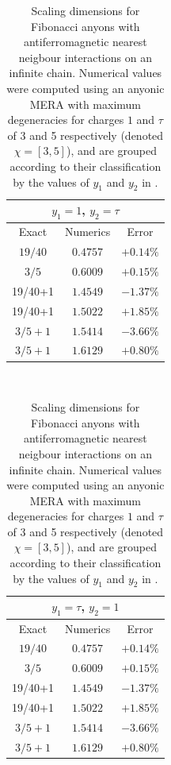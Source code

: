 \documentclass[aps,prb,reprint,superscriptaddress,amsfonts,amsmath,amssymb,showpacs,floatfix]{revtex4-1}
\newcommand{\fref}[1]{Fig.~\ref{#1}}
\begin{document}
\begin{table}
\begin{tabular}{|c|c|c|}
\hline
\multicolumn{3}{|c|}{$y_1=1$, $y_2=\tau$}\\
\hline\hline
Exact & Numerics & Error \\
\hline
$19/40$ & $0.4757$ & $+0.14\%$\\ %
$3/5$   & $0.6009$ & $+0.15\%$\\ %
19/40+1 & $1.4549$ & $-1.37\%$\\
19/40+1 & $1.5022$ & $+1.85\%$\\
$3/5+1$ & $1.5414$ & $-3.66\%$\\
$3/5+1$ & $1.6129$ & $+0.80\%$\\
\hline
\end{tabular}
~
\begin{tabular}{|c|c|c|}
\hline
\multicolumn{3}{|c|}{$y_1=\tau$, $y_2=1$}\\
\hline\hline
Exact & Numerics & Error \\
\hline
$19/40$ & $0.4757$ & $+0.14\%$\\
$3/5$   & $0.6009$ & $+0.15\%$\\
19/40+1 & $1.4549$ & $-1.37\%$\\
19/40+1 & $1.5022$ & $+1.85\%$\\
$3/5+1$ & $1.5414$ & $-3.66\%$\\
$3/5+1$ & $1.6129$ & $+0.80\%$\\
\hline
\end{tabular}
\caption{Scaling dimensions for Fibonacci anyons with antiferromagnetic nearest neigbour interactions on an infinite chain. Numerical values were computed using an anyonic MERA with maximum degeneracies for charges $1$ and $\tau$ of 3 and 5 respectively (denoted $\chi=[3,5]$), and are grouped according to their classification by the values of $y_1$ and $y_2$ in \protect{\fref{fig:scalingsuperop}}.
\label{tab:results}}
\end{table}
\end{document}
